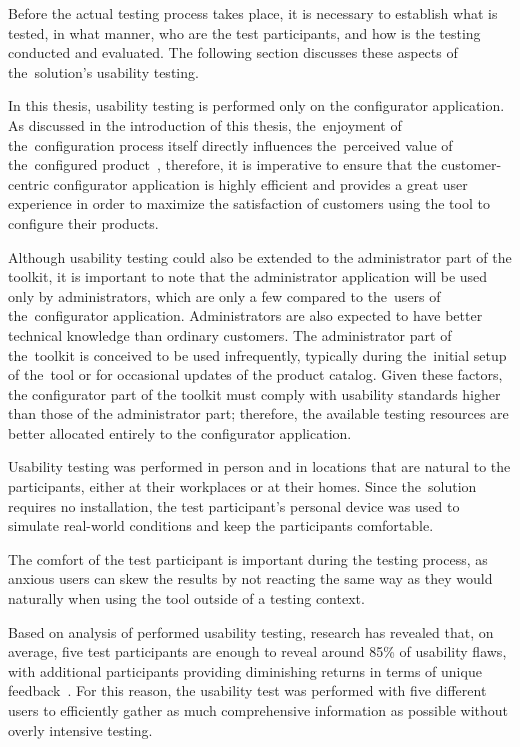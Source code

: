 Before the actual testing process takes place, it is necessary to establish what is tested, in what manner, who are the test participants, and how is the testing conducted and evaluated. The following section discusses these aspects of the~solution's usability testing.

In this thesis, usability testing is performed only on the configurator application. As discussed in the introduction of this thesis, the~enjoyment of the~configuration process itself directly influences the~perceived value of the~configured product~\cite{Franke2010}, therefore, it is imperative to ensure that the customer-centric configurator application is highly efficient and provides a great user experience in order to maximize the satisfaction of customers using the tool to configure their products.

Although usability testing could also be extended to the administrator part of the toolkit, it is important to note that the administrator application will be used only by administrators, which are only a few compared to the~users of the~configurator application. Administrators are also expected to have better technical knowledge than ordinary customers. The administrator part of the~toolkit is conceived to be used infrequently, typically during the~initial setup of the~tool or for occasional updates of the product catalog. Given these factors, the configurator part of the toolkit must comply with usability standards higher than those of the administrator part; therefore, the available testing resources are better allocated entirely to the configurator application.

Usability testing was performed in person and in locations that are natural to the participants, either at their workplaces or at their homes. Since the~solution requires no installation, the test participant's personal device was used to simulate real-world conditions and keep the participants comfortable.

The comfort of the test participant is important during the testing process, as anxious users can skew the results by not reacting the same way as they would naturally when using the tool outside of a testing context.~\cite{Nielsen1994}

Based on analysis of performed usability testing, research has revealed that, on average, five test participants are enough to reveal around 85\% of usability flaws, with additional participants providing diminishing returns in terms of unique feedback~\cite{Nielsen2000}. For this reason, the usability test was performed with five different users to efficiently gather as much comprehensive information as possible without overly intensive testing.  

